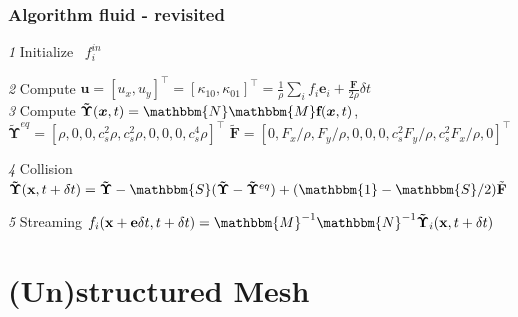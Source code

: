 \documentclass[10pt]{beamer}
\begin{document}
\begin{frame}[plain] \frametitle{Algorithm fluid - revisited} 
\textit{1} Initialize $ \enspace f_i ^{in} $ \\ \vspace{2.em}

\textit{2} Compute 
$\textbf{u} = [u_x, u_y]^\top = [ \kappa_{10}, \kappa_{01}]^\top 
= \frac{1}{\rho}\sum_i f_i \textbf{e}_i + \frac{\textbf{F}}{2 \rho} \delta t \nonumber  $ \\ \vspace{2.em}
\textit{3} Compute \linebreak
$\boldsymbol{\tilde{\Upsilon}}(\boldsymbol{x},t)
=\mathbbm{N}\mathbbm{M}\textbf{f}(\boldsymbol{x},t)$, \linebreak
$\boldsymbol{\tilde{\Upsilon}}^{eq} =
    [\rho, 
     0,  
     0, 
     c_s^2 \rho, 
     c_s^2 \rho, 
     0, 
     0, 
     0, 
     c_s^4 \rho] ^\top \nonumber  
$
$\tilde{\boldsymbol{F}}  = 
[
     0, 
     F_x /\rho , 
     F_y /\rho , 
     0, 
     0, 
     0, 
     c_s^2 F_y /\rho , 
     c_s^2 F_x /\rho , 
     0]^\top \nonumber 
$
\\ \vspace{2.em}
 
\textit{4} Collision  %
$  \boldsymbol{\tilde{\Upsilon}}(\textbf{x}, t + \delta t ) = 
\boldsymbol{\tilde{\Upsilon}} 
- \mathbbm{S} (\boldsymbol{\tilde{\Upsilon}} - \boldsymbol{\tilde{\Upsilon}}^{eq})
+ (\mathbbm{1} - \mathbbm{S}/2)\tilde{\textbf{F}} $ \\ \vspace{2.em}

\textit{5} Streaming 
$  f_i(\textbf{x} + \textbf{e}\delta t, t + \delta t ) 
 =  
\mathbbm{M}^{-1} \mathbbm{N}^{-1} \boldsymbol{\tilde{\Upsilon}}_{i}(\textbf{x}, t + \delta t )  $ 
\end{frame} 

\section{(Un)structured Mesh}
\end{document}
